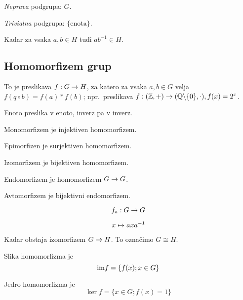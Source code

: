 
\textit{Neprava} podgrupa: $G$.

\textit{Trivialna} podgrupa: $\{\text{enota}\}$.


Kadar za vsaka $a, b \in H$ tudi $ab^{-1} \in H$.

\subsection{Homomorfizem grup}


To je preslikava $f: G \to H$, za katero za vsaka $a, b \in G$ velja $f(q\circ b) = f(a) * f(b)$; npr.~preslikava $f: (\mathbb{Z}, +) \to (\mathbb{Q} \backslash \{0\}, \cdot), f(x) = 2^x$.


Enoto preslika v enoto, inverz pa v inverz.


Monomorfizem je injektiven homomorfizem.

Epimorfizen je surjektiven homomorfizem.

Izomorfizem je bijektiven homomorfizem.

Endomorfizem je homomorfizem $G \to G$.

Avtomorfizem je bijektivni endomorfizem.


\[
	f_a : G \to G
\]

\[
	x \mapsto a x a^{-1}
\]


Kadar obstaja izomorfizem $G \to H$. To označimo $G \cong H$.


Slika homomorfizma je \[
	\text{im} f = \{f(x); x \in G\}
\]

Jedro homomorfizma je \[
	\ker f = \{x \in G; f(x) = 1\}
\]


